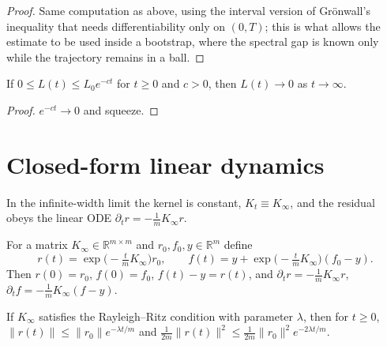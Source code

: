 \begin{proof}
  \leanok
Same computation as above, using the interval version of Gr\"onwall's inequality that needs differentiability only on $(0,T)$; this is what allows
the estimate to be used inside a bootstrap, where the spectral gap is known only while the trajectory remains in a ball.
\end{proof}

\begin{lemma}\label{lem:ntkgf:tendstoZero}
  \leanok
If $0\le L(t)\le L_0e^{-ct}$ for $t\ge0$ and $c>0$, then $L(t)\to0$ as $t\to\infty$.
\end{lemma}

\begin{proof}
  \leanok
$e^{-ct}\to0$ and squeeze.
\end{proof}


\section{Closed-form linear dynamics}\label{sec:ntkgf:linear}

In the infinite-width limit the kernel is constant, $K_t\equiv K_\infty$, and the residual obeys the linear ODE $\partial_tr=-\frac1mK_\infty r$.

\begin{theorem}\label{thm:ntkgf:matrixExp}
  \leanok
For a matrix $K_\infty\in\mathbb R^{m\times m}$ and $r_0,f_0,y\in\mathbb R^m$ define
\[
  r(t)=\exp\!\bigl(-\tfrac tmK_\infty\bigr)r_0,\qquad f(t)=y+\exp\!\bigl(-\tfrac tmK_\infty\bigr)(f_0-y).
\]
Then $r(0)=r_0$, $f(0)=f_0$, $f(t)-y=r(t)$, and $\partial_tr=-\frac1mK_\infty r$, $\partial_tf=-\frac1mK_\infty(f-y)$. 

If $K_\infty$ satisfies the
Rayleigh--Ritz condition with parameter $\lambda$, then for $t\ge0$,
$\|r(t)\|\le\|r_0\|e^{-\lambda t/m}$ and $\frac1{2m}\|r(t)\|^2\le\frac1{2m}\|r_0\|^2e^{-2\lambda t/m}$.
\end{theorem}


